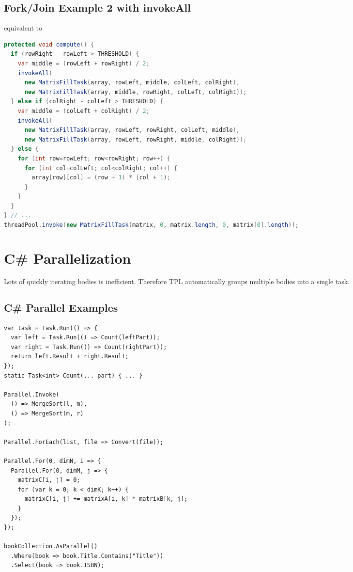 \begin{multicols*}{4}
    \subsection{Fork/Join Example 2 with invokeAll}
     equivalent to 
    \begin{lstlisting}[language=java]
protected void compute() {
  if (rowRight - rowLeft > THRESHOLD) {
    var middle = (rowLeft + rowRight) / 2;
    invokeAll(
      new MatrixFillTask(array, rowLeft, middle, colLeft, colRight),
      new MatrixFillTask(array, middle, rowRight, colLeft, colRight));
  } else if (colRight - colLeft > THRESHOLD) {
    var middle = (colLeft + colRight) / 2;
    invokeAll(
      new MatrixFillTask(array, rowLeft, rowRight, colLeft, middle),
      new MatrixFillTask(array, rowLeft, rowRight, middle, colRight));
  } else {
    for (int row=rowLeft; row<rowRight; row++) {
      for (int col=colLeft; col<colRight; col++) {
        array[row][col] = (row + 1) * (col + 1);
      }
    }
  }
} // ...
threadPool.invoke(new MatrixFillTask(matrix, 0, matrix.length, 0, matrix[0].length));
\end{lstlisting}


\section{C\# Parallelization}
    Lots of quickly iterating bodies is inefficient.
    Therefore TPL automatically groups multiple bodies into a single task.
    \subsection{C\# Parallel Examples}
    \begin{lstlisting}[language={[Sharp]C}]
var task = Task.Run(() => {
  var left = Task.Run(() => Count(leftPart));
  var right = Task.Run(() => Count(rightPart));
  return left.Result + right.Result;
});
static Task<int> Count(... part) { ... }

Parallel.Invoke(
  () => MergeSort(l, m),
  () => MergeSort(m, r)
);

Parallel.ForEach(list, file => Convert(file));

Parallel.For(0, dimN, i => {
  Parallel.For(0, dimM, j => {
    matrixC[i, j] = 0;
    for (var k = 0; k < dimK; k++) {
      matrixC[i, j] += matrixA[i, k] * matrixB[k, j];
    }
  });
});

bookCollection.AsParallel()
  .Where(book => book.Title.Contains("Title"))
  .Select(book => book.ISBN);
\end{lstlisting}


\end{multicols*}
